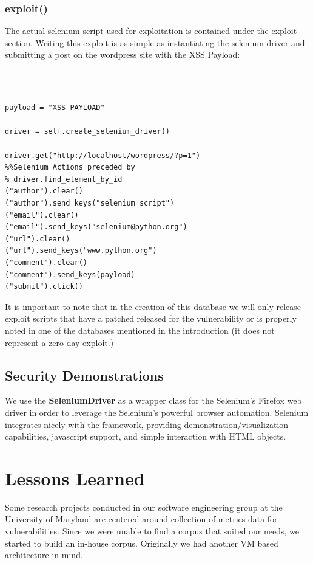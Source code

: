 \documentclass[letterpaper,twocolumn,10pt]{article}
\begin{document}
\subsubsection{exploit()}

The actual selenium script used for exploitation is contained under the exploit section.  Writing this exploit is as simple as instantiating the selenium driver and submitting a post on the wordpress site with the XSS Payload: 

{\tt \footnotesize
\begin{verbatim}

payload = "XSS PAYLOAD"

driver = self.create_selenium_driver()

driver.get("http://localhost/wordpress/?p=1")
%%Selenium Actions preceded by
% driver.find_element_by_id
("author").clear()
("author").send_keys("selenium script")
("email").clear()
("email").send_keys("selenium@python.org")
("url").clear()
("url").send_keys("www.python.org")
("comment").clear()
("comment").send_keys(payload)
("submit").click()

\end{verbatim}
}

It is important to note that in the creation of this database we will only release exploit scripts that have a patched released for the vulnerability or is properly noted in one of the databases mentioned in the introduction (it does not represent a zero-day exploit.)


\subsection{Security Demonstrations}
We use the {\bf SeleniumDriver} as a wrapper class for the Selenium's Firefox web driver in order to leverage the Selenium's powerful browser automation.  Selenium integrates nicely with the framework, providing demonstration/visualization capabilities, javascript support, and simple interaction with HTML objects.



\section{Lessons Learned}

Some research projects conducted in our software engineering group at the University of Maryland are centered around collection of metrics data for vulnerabilities.  Since we were unable to find a corpus that suited our needs, we started to build an in-house corpus.  Originally we had another VM based architecture in mind. \par
\end{document}

